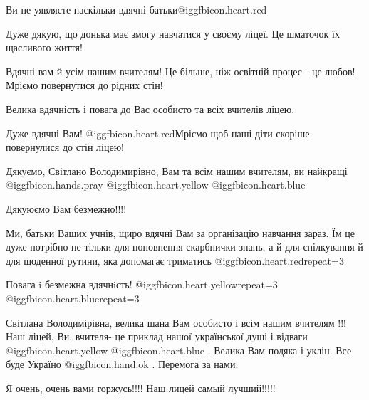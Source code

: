  
 
 
 
 
\zzSecCmt

\begin{itemize} %
Ви не уявляєте наскільки вдячні батьки@igg{fbicon.heart.red}

Дуже дякую, що донька має змогу навчатися у своєму ліцеї. Це шматочок їх щасливого життя!

Вдячні вам й усім нашим вчителям! Це більше, ніж освітній процес - це любов! Мріємо повернутися до рідних стін!

Велика вдячність і повага до Вас особисто та всіх вчителів ліцею.

Дуже вдячні Вам! @igg{fbicon.heart.red}Мріємо щоб наші діти скоріше повернулися до стін ліцею!


Дякуємо, Світлано Володимирівно, Вам та всім нашим вчителям, ви найкращі
@igg{fbicon.hands.pray}  @igg{fbicon.heart.yellow}
@igg{fbicon.heart.blue} 

Дякуюємо Вам безмежно!!!!


Ми, батьки Ваших учнів, щиро вдячні Вам за організацію навчання зараз. Їм це
дуже потрібно не тільки для поповнення скарбнички знань, а й для спілкування й
для щоденної рутини, яка допомагає триматись @igg{fbicon.heart.red}{repeat=3}

Повага i безмежна вдячнiсть! @igg{fbicon.heart.yellow}{repeat=3}  @igg{fbicon.heart.blue}{repeat=3} 


Світлана Володимірівна, велика шана Вам особисто і всім нашим вчителям !!! Наш
ліцей, Ви, вчителя- це приклад нашої української душі і відваги  @igg{fbicon.heart.yellow}  @igg{fbicon.heart.blue} . Велика
Вам подяка і уклін. Все буде Україно @igg{fbicon.hand.ok} . Перемога за нами.

Я очень, очень вами горжусь!!!! Наш лицей самый лучший!!!!!


\end{itemize}
